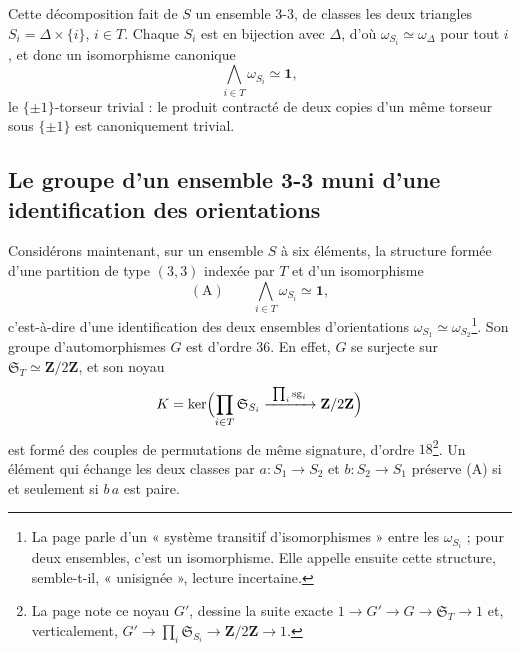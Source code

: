 \documentclass[11pt,a4paper]{article}
\begin{document}
Cette décomposition fait de $S$ un ensemble 3-3, de classes les deux triangles
$S_i = \Delta \times \{i\}$, $i \in T$. Chaque $S_i$ est en bijection avec $\Delta$,
d'où $\omega_{S_i} \simeq \omega_\Delta$ pour tout $i$, et donc un isomorphisme
canonique
\[
\bigwedge_{i \in T} \omega_{S_i} \simeq \mathbf{1},
\]
le $\{\pm 1\}$-torseur trivial : le produit contracté de deux copies d'un même
torseur sous $\{\pm 1\}$ est canoniquement trivial.

\subsection*{Le groupe d'un ensemble 3-3 muni d'une identification des orientations}

Considérons maintenant, sur un ensemble $S$ à six éléments, la structure formée
d'une partition de type $(3,3)$ indexée par $T$ et d'un isomorphisme
\[
(\mathrm{A}) \qquad \bigwedge_{i \in T} \omega_{S_i} \simeq \mathbf{1},
\]
c'est-à-dire d'une identification des deux ensembles d'orientations
$\omega_{S_1} \simeq \omega_{S_2}$\footnote{La page parle d'un « système
transitif d'isomorphismes » entre les $\omega_{S_i}$ ; pour deux ensembles, c'est
un isomorphisme. Elle appelle ensuite cette structure, semble-t-il,
« unisignée », lecture incertaine.}. Son groupe d'automorphismes $G$ est
d'ordre $36$. En effet, $G$ se surjecte sur $\mathfrak{S}_T \simeq \mathbf{Z}/2\mathbf{Z}$, et son
noyau
\[
K = \ker\Bigl(\prod_{i \in T} \mathfrak{S}_{S_i} \xrightarrow{\ \prod_i \mathrm{sg}_i\ } \mathbf{Z}/2\mathbf{Z}\Bigr)
\]
est formé des couples de permutations de même signature, d'ordre $18$\footnote{La
page note ce noyau $G'$, dessine la suite exacte $1 \to G' \to G \to \mathfrak{S}_T \to 1$
et, verticalement, $G' \to \prod_i \mathfrak{S}_{S_i} \to \mathbf{Z}/2\mathbf{Z} \to 1$.}.
Un élément qui échange les deux classes par $a : S_1 \to S_2$ et
$b : S_2 \to S_1$ préserve (A) si et seulement si $b\,a$ est paire.
\end{document}
